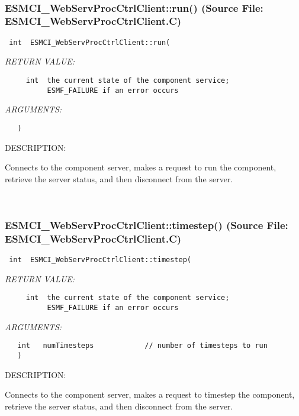  
\mbox{}\hrulefill\
 
\subsubsection{ESMCI\_WebServProcCtrlClient::run() (Source File: ESMCI\_WebServProcCtrlClient.C)}


  
\begin{verbatim} int  ESMCI_WebServProcCtrlClient::run(\end{verbatim}{\em RETURN VALUE:}
\begin{verbatim}     int  the current state of the component service;
          ESMF_FAILURE if an error occurs\end{verbatim}{\em ARGUMENTS:}
\begin{verbatim}   )\end{verbatim}
{\sf DESCRIPTION:\\ }


      Connects to the component server, makes a request to run the
      component, retrieve the server status, and then disconnect from
      the server.
   
 
\mbox{}\hrulefill\
 
\subsubsection{ESMCI\_WebServProcCtrlClient::timestep() (Source File: ESMCI\_WebServProcCtrlClient.C)}


  
\begin{verbatim} int  ESMCI_WebServProcCtrlClient::timestep(\end{verbatim}{\em RETURN VALUE:}
\begin{verbatim}     int  the current state of the component service;
          ESMF_FAILURE if an error occurs\end{verbatim}{\em ARGUMENTS:}
\begin{verbatim}   int   numTimesteps            // number of timesteps to run
   )\end{verbatim}
{\sf DESCRIPTION:\\ }


      Connects to the component server, makes a request to timestep the
      component, retrieve the server status, and then disconnect from
      the server.
   
